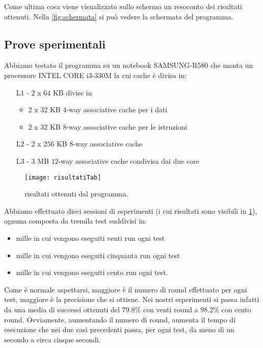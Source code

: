 				Come ultima cosa viene visualizzato sullo schermo un resoconto dei risultati ottenuti. Nella \cref{fig:schermata} si può vedere la schermata del programma.
			
			\subsection{Prove sperimentali}
				Abbiamo testato il programma su un notebook SAMSUNG-R$580$ che monta un processore INTEL CORE i$3$-$330$M la cui cache è divisa in:
				\begin{itemize}
					\item [L$1$ -] $2$ x $64$ KB divise in 
					\begin{itemize}
						\item  $2$ x $32$ KB $4$-way associative cache per i dati
						\item  $2$ x $32$ KB $8$-way associative cache per le istruzioni
					\end{itemize}
					\item[L$2$ -] $2$ x $256$ KB $8$-way associative cache
					\item[L$3$ -] $3$ MB $12$-way associative cache condivisa dai due core
				\end{itemize}
			
				\begin{figure}
					\begin{center}
						\texttt{[image: risultatiTab]}
						\caption[Risultati SPARK]{risultati ottenuti dal programma.}
						\label{fig:risultati}
					\end{center}
				\end{figure}
			
				Abbiamo effettuato dieci sessioni di esperimenti (i cui risultati sono visibili in \cref{fig:risultati}), ognuna composta da tremila test suddivisi in:
				\begin{itemize}
					\item mille in cui vengono eseguiti venti run ogni test
					\item mille in cui vengono eseguiti cinquanta run ogni test
					\item mille in cui vengono eseguiti cento run ogni test.
				\end{itemize}
				
				Come è normale aspettarsi, maggiore è il numero di round effettuato per ogni test, maggiore è la precisione che si ottiene. Nei nostri esperimenti si passa infatti da una media di successi ottenuti del $79.8\%$ con venti round a $98.2\%$ con cento round. Ovviamente, aumentando il numero di round, aumenta il tempo di esecuzione che nei due casi precedenti passa, per ogni test, da meno di un secondo a circa cinque secondi.
					